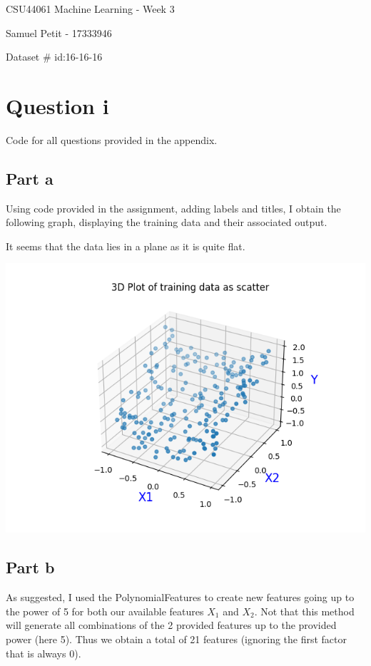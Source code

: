 \documentclass[10pt]{article}
\begin{document}
{\centering
    CSU44061 Machine Learning - Week 3
    \par
    Samuel Petit - 17333946
    \par
    Dataset \# id:16-16-16
    \par
}
\section*{Question i}
Code for all questions provided in the appendix.
\subsection*{Part a}
Using code provided in the assignment, adding labels and titles,
I obtain the following graph, displaying the training data and their associated
output.


It seems that the data lies in a plane as it is quite flat.

\begin{center}
    \includegraphics[scale=0.5]{Figure_1.png}
\end{center}


\subsection*{Part b}
As suggested, I used the PolynomialFeatures to create new features
going up to the power of 5 for both our available features $X_{1}$ and $X_{2}$.
Not that this method will generate all combinations of the 2 provided
features up to the provided power (here 5). Thus we obtain a total of 21 features 
(ignoring the first factor that is always 0).
\end{document}
